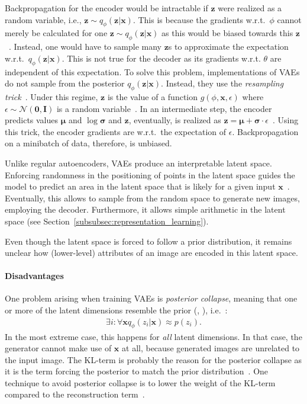 Backpropagation for the encoder would be intractable if $\bm{z}$ were realized as a random variable, i.e., $\bm{z} \sim q_\phi(\bm{z}|\bm{x})$.
This is because the gradients w.r.t.~$\phi$ cannot merely be calculated for one $\bm{z} \sim q_\phi(\bm{z}|\bm{x})$ as this would be biased towards this $\bm{z}$~\citep{kingma2019introduction}.
Instead, one would have to sample many $\bm{z}$s to approximate the expectation w.r.t.~$q_\phi(\bm{z}|\bm{x})$.
This is not true for the decoder as its gradients w.r.t. $\theta$ are independent of this expectation.
To solve this problem, implementations of \acp{VAE} do not sample from the posterior $q_\phi(\bm{z}|\bm{x})$.
Instead, they use the \textit{resampling trick}~\citep{kingma2019introduction}.
Under this regime, $\bm{z}$ is the value of a function $g(\phi, \bm{x}, \epsilon)$ where $\epsilon \sim \mathcal{N}(\bm{0}, \bm{I})$ is a random variable~\citep{kingma2019introduction}.
In an intermediate step, the encoder predicts values $\bm{\mu}$ and $\log \bm{\sigma}$ and $\bm{z}$, eventually, is realized as $\bm{z} = \bm{\mu} + \bm{\sigma} \cdot \epsilon$~\citep{kingma2019introduction}.
Using this trick, the encoder gradients are w.r.t.~the expectation of $\epsilon$.
Backpropagation on a minibatch of data, therefore, is unbiased.

Unlike regular autoencoders, \acp{VAE} produce an interpretable latent space.
Enforcing randomness in the positioning of points in the latent space guides the model to predict an area in the latent space that is likely for a given input $\bm{x}$~\citep[p. 701]{Goodfellow-et-al-2016}.
Eventually, this allows to sample from the random space to generate new images, employing the decoder.
Furthermore, it allows simple arithmetic in the latent space (see Section~\ref{subsubsec:representation_learning}).

Even though the latent space is forced to follow a prior distribution, it remains unclear how (lower-level) attributes of an image are encoded in this latent space.

\paragraph{Disadvantages}

One problem arising when training \acp{VAE} is \textit{posterior collapse}, meaning that one or more of the latent dimensions resemble the prior (\citep[p. 694]{Goodfellow-et-al-2016}, \citep{lucas2019understanding}), i.e.~\citep{lucas2019understanding}:
\begin{align}
    \exists i: \forall \mathbf{x} q_{\phi}\left(z_{i} | \mathbf{x}\right) \approx p\left(z_{i}\right) .
\end{align}
In the most extreme case, this happens for \textit{all} latent dimensions.
In that case, the generator cannot make use of $\bm{x}$ at all, because generated images are unrelated to the input image.
The KL-term is probably the reason for the posterior collapse as it is the term forcing the posterior to match the prior distribution~\citep{lucas2019understanding}.
One technique to avoid posterior collapse is to lower the weight of the KL-term compared to the reconstruction term~\citep{lucas2019understanding}.

